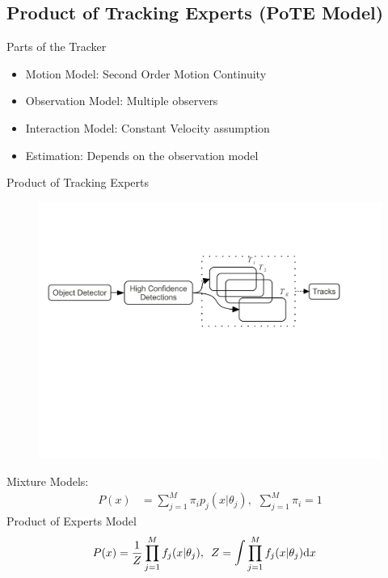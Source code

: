 \subsection[]{Product of Tracking Experts (PoTE Model)}

\begin{frame}{Parts of the Tracker}
\begin{itemize}
\item Motion Model: Second Order Motion Continuity
\item Observation Model: Multiple observers 
\item Interaction Model: Constant Velocity assumption
\item Estimation: Depends on the observation model
\end{itemize}
\end{frame}


\begin{frame}{Product of Tracking Experts}
\begin{figure}
	\includegraphics[scale=0.4,trim=5mm 105mm 30mm 40mm,clip]{figures/converted/trackerfusion}
	\label{fig:systemflow}
\end{figure}
Mixture Models:
\begin{align*}
P(x) &= \sum_{j=1}^M \pi_{i}p_{j}(x|\theta_j),\hspace{5pt}  \sum_{j=1}^M \pi_{i} = 1
\end{align*}
Product of Experts Model
\begin{align*}
P(x) &= \frac{1}{Z} \prod\limits_{j=1}^M f_{j}(x|\theta_j),\hspace{5pt} Z = \mathlarger{\int}  \prod\limits_{j=1}^M f_{j}(x|\theta_j) \mathrm{d}x
\end{align*}
\end{frame}

